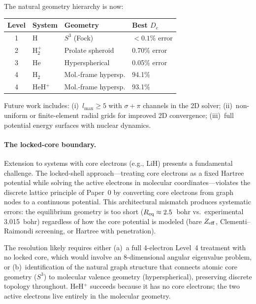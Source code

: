 \documentclass[aps,pra,twocolumn,superscriptaddress,longbibliography]{revtex4-2}
\begin{document}
The natural geometry hierarchy is now:
\begin{center}
\begin{tabular}{clll}
\toprule
Level & System & Geometry & Best $D_e$ \\
\midrule
1 & H       & $S^3$ (Fock)        & $<0.1\%$ error \\
2 & H$_2^+$ & Prolate spheroid    & 0.70\% error \\
3 & He      & Hyperspherical      & 0.05\% error \\
4 & H$_2$   & Mol.-frame hypersp. & 94.1\% \\
4 & HeH$^+$ & Mol.-frame hypersp. & 93.1\% \\
\bottomrule
\end{tabular}
\end{center}

Future work includes: (i)~$l_{\max} \ge 5$ with $\sigma{+}\pi$ channels
in the 2D solver; (ii)~non-uniform or finite-element radial grids
for improved 2D convergence; (iii)~full potential energy surfaces
with nuclear dynamics.

\paragraph{The locked-core boundary.}
Extension to systems with core electrons (e.g., LiH) presents a
fundamental challenge.  The locked-shell approach---treating core
electrons as a fixed Hartree potential while solving the active electrons
in molecular coordinates---violates the discrete lattice principle of
Paper~0 by converting core electrons from graph nodes to a continuous
potential.  This architectural mismatch produces systematic errors: the
equilibrium geometry is too short ($R_{\rm eq} \approx 2.5$~bohr vs.\
experimental 3.015~bohr) regardless of how the core potential is modeled
(bare $Z_{\rm eff}$, Clementi--Raimondi screening, or Hartree with
penetration).

The resolution likely requires either (a)~a full 4-electron Level~4
treatment with no locked core, which would involve an 8-dimensional
angular eigenvalue problem, or (b)~identification of the natural graph
structure that connects atomic core geometry ($S^3$) to molecular valence
geometry (hyperspherical), preserving discrete topology throughout.
HeH$^+$ succeeds because it has no core electrons; the two active
electrons live entirely in the molecular geometry.
\end{document}
